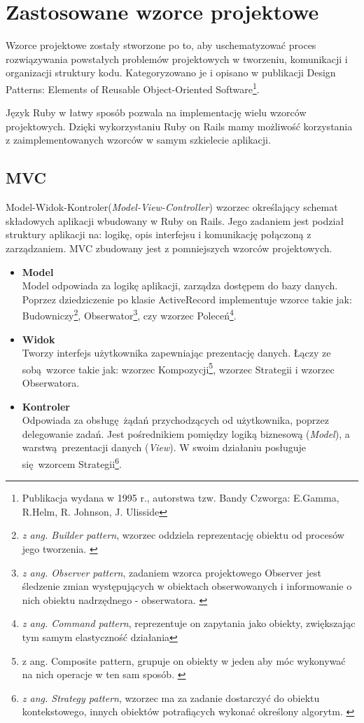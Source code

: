 \section{Zastosowane wzorce projektowe}
\label{sec:patterns}
Wzorce projektowe zostały stworzone po to, aby uschematyzować proces rozwiązywania powstałych problemów projektowych w tworzeniu, komunikacji i organizacji struktury kodu. Kategoryzowano je i opisano w publikacji Design Patterns: Elements of Reusable Object-Oriented Software\footnote{Publikacja wydana w 1995 r., autorstwa tzw. Bandy Czworga: E.Gamma, R.Helm, R. Johnson, J. Ulisside}.

Język Ruby w łatwy sposób pozwala na implementację wielu wzorców projektowych. Dzięki wykorzystaniu Ruby on Rails mamy możliwość korzystania z zaimplementowanych wzorców w samym szkielecie aplikacji.
  \subsection{MVC}
   Model-Widok-Kontroler(\emph{Model-View-Controller}) wzorzec określający schemat składowych aplikacji wbudowany w Ruby on Rails. Jego zadaniem jest podział struktury aplikacji na: logikę, opis interfejsu i komunikację połączoną z zarządzaniem.
   MVC zbudowany jest z pomniejszych wzorców projektowych.
    \begin{itemize}
      \item \textbf {Model} \\
      Model odpowiada za logikę aplikacji, zarządza dostępem do bazy danych.
      Poprzez dziedziczenie po klasie ActiveRecord implementuje wzorce takie jak: Budowniczy\footnote{\emph{z ang. Builder pattern}, wzorzec oddziela reprezentację obiektu od procesów jego tworzenia. \cite{ruby_patterns}}, Obserwator\footnote{\emph{z ang. Observer pattern}, zadaniem wzorca projektowego Observer jest śledzenie zmian występujących w obiektach obserwowanych i informowanie o nich obiektu nadrzędnego - obserwatora. \cite{ruby_patterns}}, czy wzorzec Poleceń\footnote{\emph{z ang. Command pattern}, reprezentuje on zapytania jako obiekty, zwiększając tym samym elastyczność działania\cite{ruby_patterns}}.

      \item \textbf {Widok} \\
      Tworzy interfejs użytkownika zapewniając prezentację danych. Łączy ze sobą wzorce takie jak: wzorzec Kompozycji\footnote{z ang. Composite pattern, grupuje on obiekty w jeden aby móc wykonywać na nich operacje w ten sam sposób. \cite{ruby_patterns}}, wzorzec Strategii i wzorzec Obserwatora.

      \item \textbf {Kontroler} \\
      Odpowiada za obsługę żądań przychodzących od użytkownika, poprzez delegowanie zadań. Jest pośrednikiem pomiędzy logiką biznesową (\emph{Model}), a warstwą prezentacji danych (\emph{View}). W swoim działaniu posługuje się wzorcem Strategii\footnote{ \emph{z ang. Strategy pattern}, wzorzec ma za zadanie dostarczyć do obiektu kontekstowego, innych obiektów potrafiących wykonać określony algorytm. \cite{ruby_patterns}}.
    \end{itemize}

